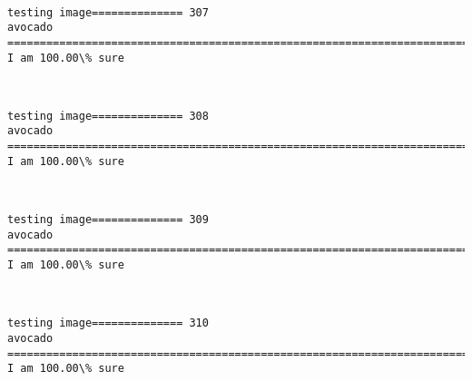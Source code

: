\documentclass[11pt]{article}
\begin{document}
    \begin{center}
    \end{center}
    { \hspace*{\fill} \\}
    
    \begin{Verbatim}[commandchars=\\\{\}]
testing image============== 307
avocado
============================================================================
I am 100.00\% sure

    \end{Verbatim}

    \begin{center}
    \end{center}
    { \hspace*{\fill} \\}
    
    \begin{Verbatim}[commandchars=\\\{\}]
testing image============== 308
avocado
============================================================================
I am 100.00\% sure

    \end{Verbatim}

    \begin{center}
    \end{center}
    { \hspace*{\fill} \\}
    
    \begin{Verbatim}[commandchars=\\\{\}]
testing image============== 309
avocado
============================================================================
I am 100.00\% sure

    \end{Verbatim}

    \begin{center}
    \end{center}
    { \hspace*{\fill} \\}
    
    \begin{Verbatim}[commandchars=\\\{\}]
testing image============== 310
avocado
============================================================================
I am 100.00\% sure

    \end{Verbatim}
\end{document}
